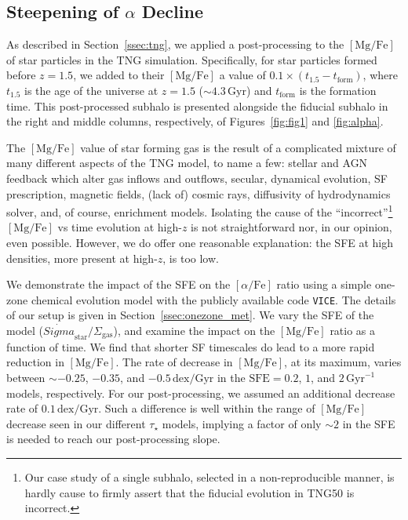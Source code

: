 \documentclass[twocolumn]{aastex631}
\newcommand{\Gyr}{\ensuremath{\textrm{Gyr}}}
\newcommand{\MgFe}{\ensuremath{[\textrm{Mg}/\textrm{Fe}]}}
\newcommand{\alphaFe}{\ensuremath{[\alpha/\textrm{Fe}]}}
\newcommand{\dex}{\ensuremath{\textrm{dex}}}
\begin{document}
\subsection{Steepening of $\alpha$ Decline}\label{ssec:sfe}
As described in Section~\ref{ssec:tng}, we applied a post-processing to the \MgFe{} of star particles in the TNG simulation. Specifically, for star particles formed before $z=1.5$, we added to their \MgFe{} a value of $0.1\times\left(t_{1.5}-t_{\textrm{form}}\right)$, where $t_{1.5}$ is the age of the universe at $z=1.5$ ($\sim4.3\,\Gyr$) and $t_{\textrm{form}}$ is the formation time. This post-processed subhalo is presented alongside the fiducial subhalo in the right and middle columns, respectively, of Figures~\ref{fig:fig1} and \ref{fig:alpha}.

The \MgFe{} value of star forming gas is the result of a complicated mixture of many different aspects of the TNG model, to name a few: stellar and AGN feedback which alter gas inflows and outflows, secular, dynamical evolution, SF prescription, magnetic fields, (lack of) cosmic rays, diffusivity of hydrodynamics solver, and, of course, enrichment models. Isolating the cause of the ``incorrect''\footnote{Our case study of a single subhalo, selected in a non-reproducible manner, is hardly cause to firmly assert that the fiducial evolution in TNG50 is incorrect.} \MgFe{} vs time evolution at high-$z$ is not straightforward nor, in our opinion, even possible. However, we do offer one reasonable explanation: the SFE at high densities, more present at high-$z$, is too low.

We demonstrate the impact of the SFE on the \alphaFe{} ratio using a simple one-zone chemical evolution model with the publicly available code \texttt{VICE}. The details of our setup is given in Section~\ref{ssec:onezone_met}. We vary the SFE of the model ($\dot{Sigma}_{\textrm{star}}/\Sigma_{\textrm{gas}}$), and examine the impact on the \MgFe{} ratio as a function of time. We find that shorter SF timescales do lead to a more rapid reduction in \MgFe{}. The rate of decrease in \MgFe{}, at its maximum, varies between $\sim-0.25$, $-0.35$, and $-0.5\,\dex/\Gyr$ in the $\textrm{SFE}=0.2$, $1$, and $2\,\Gyr^{-1}$ models, respectively. For our post-processing, we assumed an additional decrease rate of $0.1\,\dex/\Gyr$. Such a difference is well within the range of \MgFe{} decrease seen in our different $\tau_{\star}$ models, implying a factor of only $\sim2$ in the SFE is needed to reach our post-processing slope.
\end{document}
